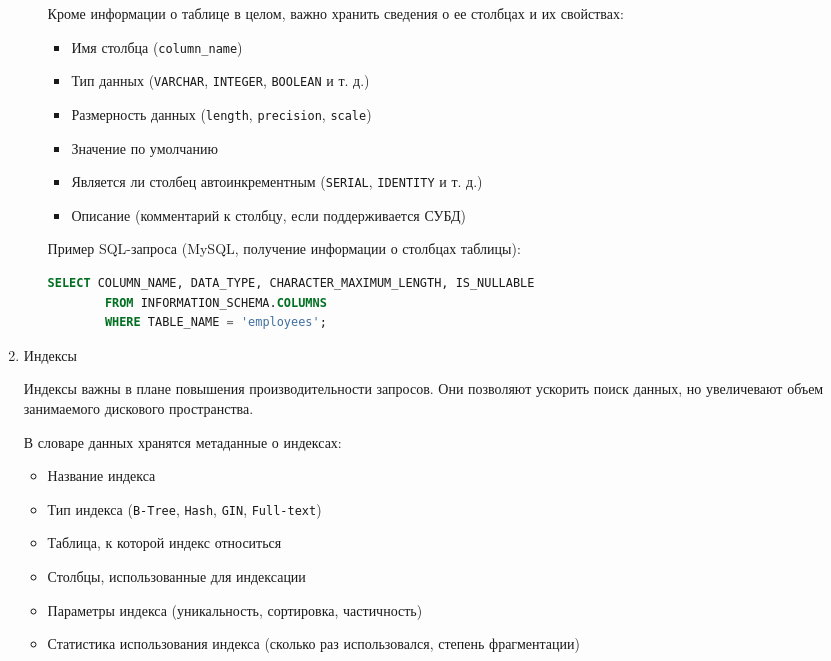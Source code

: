 \begin{enumerate}
\begin{enumerate}
        Кроме информации о таблице в целом, важно хранить сведения о ее столбцах и их свойствах:
        
        \begin{itemize}
            \item Имя столбца (\texttt{column\_name})
            \item Тип данных (\texttt{VARCHAR}, \texttt{INTEGER}, \texttt{BOOLEAN} и т. д.)
            \item Размерность данных (\texttt{length}, \texttt{precision}, \texttt{scale})
            \item Значение по умолчанию
            \item Является ли столбец автоинкрементным (\texttt{SERIAL}, \texttt{IDENTITY} и т. д.)
            \item Описание (комментарий к столбцу, если поддерживается СУБД)
        \end{itemize}

        Пример SQL-запроса (MySQL, получение информации о столбцах таблицы):
        \begin{lstlisting}[language=SQL]
        SELECT COLUMN_NAME, DATA_TYPE, CHARACTER_MAXIMUM_LENGTH, IS_NULLABLE 
        FROM INFORMATION_SCHEMA.COLUMNS 
        WHERE TABLE_NAME = 'employees';
        \end{lstlisting}
    \end{enumerate}
    
    \item Индексы

    Индексы важны в плане повышения производительности запросов. Они позволяют ускорить поиск данных, но увеличевают объем занимаемого дискового пространства.

    В словаре данных хранятся метаданные о индексах:
    \begin{itemize}
        \item Название индекса
        \item Тип индекса (\texttt{B-Tree}, \texttt{Hash}, \texttt{GIN}, \texttt{Full-text})
        \item Таблица, к которой индекс относиться
        \item Столбцы, использованные для индексации
        \item Параметры индекса (уникальность, сортировка, частичность)
        \item Статистика использования индекса (сколько раз использовался, степень фрагментации)
    \end{itemize}


\end{enumerate}
